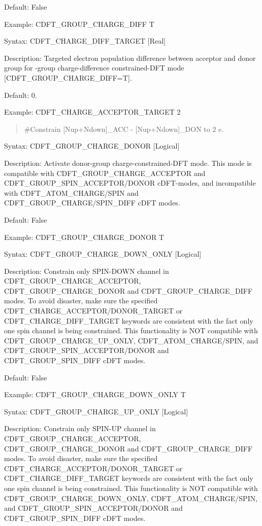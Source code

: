 \documentclass[letterpaper,10pt,english]{sphinxmanual}
\begin{document}
Default: False

Example: CDFT\_GROUP\_CHARGE\_DIFF T


Syntax: CDFT\_CHARGE\_DIFF\_TARGET {[}Real{]}

Description: Targeted electron population difference between acceptor
and donor group for -group charge-difference constrained-DFT mode
{[}CDFT\_GROUP\_CHARGE\_DIFF=T{]}.

Default: 0.

Example: CDFT\_CHARGE\_ACCEPTOR\_TARGET 2
\begin{quote}

\#Constrain {[}Nup+Ndown{]}\_ACC - {[}Nup+Ndown{]}\_DON to 2 e.
\end{quote}


Syntax: CDFT\_GROUP\_CHARGE\_DONOR {[}Logical{]}

Description: Activate donor-group charge-constrained-DFT mode. This mode
is compatible with CDFT\_GROUP\_CHARGE\_ACCEPTOR and
CDFT\_GROUP\_SPIN\_ACCEPTOR/DONOR cDFT-modes, and incompatible with
CDFT\_ATOM\_CHARGE/SPIN and CDFT\_GROUP\_CHARGE/SPIN\_DIFF cDFT modes.

Default: False

Example: CDFT\_GROUP\_CHARGE\_DONOR T


Syntax: CDFT\_GROUP\_CHARGE\_DOWN\_ONLY {[}Logical{]}

Description: Constrain only SPIN-DOWN channel in
CDFT\_GROUP\_CHARGE\_ACCEPTOR, CDFT\_GROUP\_CHARGE\_DONOR and
CDFT\_GROUP\_CHARGE\_DIFF modes. To avoid disaster, make sure the
specified CDFT\_CHARGE\_ACCEPTOR/DONOR\_TARGET or
CDFT\_CHARGE\_DIFF\_TARGET keywords are consistent with the fact only
one spin channel is being constrained. This functionality is NOT
compatible with CDFT\_GROUP\_CHARGE\_UP\_ONLY, CDFT\_ATOM\_CHARGE/SPIN,
and CDFT\_GROUP\_SPIN\_ACCEPTOR/DONOR and CDFT\_GROUP\_SPIN\_DIFF cDFT
modes.

Default: False

Example: CDFT\_GROUP\_CHARGE\_DOWN\_ONLY T


Syntax: CDFT\_GROUP\_CHARGE\_UP\_ONLY {[}Logical{]}

Description: Constrain only SPIN-UP channel in
CDFT\_GROUP\_CHARGE\_ACCEPTOR, CDFT\_GROUP\_CHARGE\_DONOR and
CDFT\_GROUP\_CHARGE\_DIFF modes. To avoid disaster, make sure the
specified CDFT\_CHARGE\_ACCEPTOR/DONOR\_TARGET or
CDFT\_CHARGE\_DIFF\_TARGET keywords are consistent with the fact only
one spin channel is being constrained. This functionality is NOT
compatible with CDFT\_GROUP\_CHARGE\_DOWN\_ONLY,
CDFT\_ATOM\_CHARGE/SPIN, and CDFT\_GROUP\_SPIN\_ACCEPTOR/DONOR and
CDFT\_GROUP\_SPIN\_DIFF cDFT modes.
\end{document}
